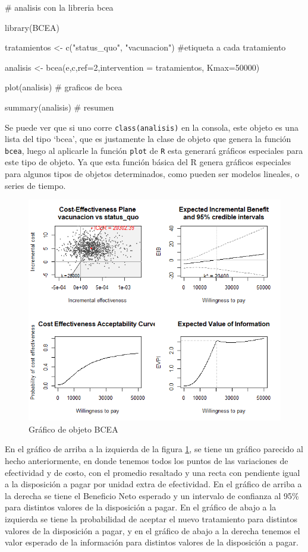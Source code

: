 \documentclass[12pt]{article}
\begin{document}
\begin{Rcode}
    # analisis con la libreria bcea

library(BCEA)

tratamientos <- c("status_quo", "vacunacion")  #etiqueta a cada tratamiento

analisis <- bcea(e,c,ref=2,intervention = tratamientos, Kmax=50000) 

plot(analisis)  # graficos de bcea

summary(analisis)  # resumen
\end{Rcode}

Se puede ver que si uno corre \texttt{class(analisis)} en la consola, este objeto es una lista del tipo `bcea', que es justamente la clase de objeto que genera la función \texttt{bcea}, luego al aplicarle la función \texttt{plot} de \texttt{R} esta generará gráficos especiales para este tipo de objeto. Ya que esta función básica del R genera gráficos especiales para algunos tipos de objetos determinados, como pueden ser modelos lineales, o series de tiempo.


\begin{figure}[H]
    \centering
    \includegraphics[width=1\textwidth]{grafi/plot_bcea.jpg}
    \caption{Gráfico de objeto BCEA}
    \label{fig:62}
\end{figure}


En el gráfico de arriba a la izquierda de la figura \ref{fig:62}, se tiene un gráfico parecido al hecho anteriormente, en donde tenemos todos los puntos de las variaciones de efectividad y de costo, con el promedio resaltado y una recta con pendiente igual a la disposición a pagar por unidad extra de efectividad. En el gráfico de arriba a la derecha se tiene el Beneficio Neto esperado y un intervalo de confianza al 95\% para distintos valores de la disposición a pagar. En el gráfico de abajo a la izquierda se tiene la probabilidad de aceptar el nuevo tratamiento para distintos valores de la disposición a pagar, y en el gráfico de abajo a la derecha tenemos el valor esperado de la información para distintos valores de la disposición a pagar.\\
\end{document}
